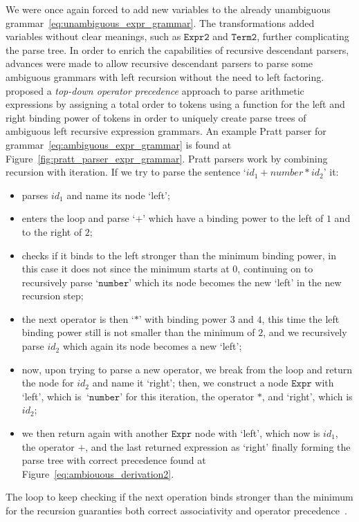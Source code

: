 \documentclass[
  oneside,
  english,
  coorientadorbanca,
  embeddedlogo,
  noabntexcite
]{ufsc-thesis-rn46-2019}
\newcommand{\code}[1]{\texttt{#1}}
\newcommand{\bnfvars}[1]{\code{#1}}
\newcommand{\bnfter}[1]{\ \bnfters{#1}}
\newcommand{\bnfters}[1]{\textrm{`}\code{#1}\textrm{'}}
\begin{document}
We were once again forced to add new variables to the already unambiguous grammar~\eqref{eq:unambiguous_expr_grammar}.
The transformations added variables without clear meanings, such as $\bnfvars{Expr2}$ and $\bnfvars{Term2}$, further complicating the parse tree.
In order to enrich the capabilities of recursive descendant parsers, advances were made to allow recursive descendant parsers to parse some ambiguous grammars with left recursion without the need to left factoring.
\textcite{pratt1973operatorprecedence} proposed a \textit{top-down operator precedence} approach to parse arithmetic expressions by assigning a total order to tokens using a function for the left and right binding power of tokens in order to uniquely create parse trees of ambiguous left recursive expression grammars.
An example Pratt parser for grammar~\eqref{eq:ambiguous_expr_grammar} is found at Figure~\ref{fig:pratt_parser_expr_grammar}.
Pratt parsers work by combining recursion with iteration.
If we try to parse the sentence `$id_1 + number * id_2$' it:
\begin{itemize}
  \item parses $id_1$ and name its node `left';
  \item enters the loop and parse $\bnfters{+}$ which have a binding power to the left of $1$ and to the right of $2$;
  \item checks if it binds to the left stronger than the minimum binding power, in this case it does not since the minimum starts at $0$, continuing on to recursively parse $\bnfters{number}$ which its node becomes the new `left' in the new recursion step;
  \item the next operator is then $\bnfters{*}$ with binding power $3$ and $4$, this time the left binding power still is not smaller than the minimum of $2$, and we recursively parse $id_2$ which again its node becomes a new `left';
  \item now, upon trying to parse a new operator, we break from the loop and return the node for $id_2$ and name it `right'; then, we construct a node $\bnfvars{Expr}$ with `left', which is $\bnfter{number}$ for this iteration, the operator $*$, and `right', which is $id_2$;
  \item we then return again with another $\bnfvars{Expr}$ node with `left', which now is $id_1$, the operator $+$, and the last returned expression as `right' finally forming the parse tree with correct precedence found at Figure~\ref{eq:ambiouous_derivation2}.
\end{itemize}
The loop to keep checking if the next operation binds stronger than the minimum for the recursion guaranties both correct associativity and operator precedence~\cite{pratt1973operatorprecedence}.
\end{document}

